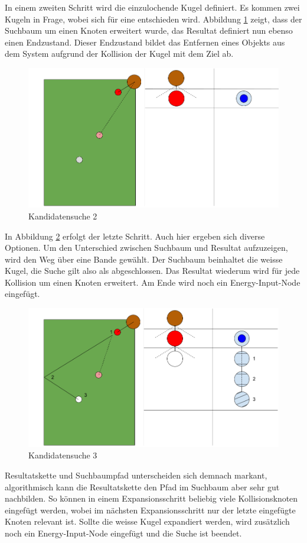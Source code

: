 In einem zweiten Schritt wird die einzulochende Kugel definiert. Es kommen zwei Kugeln in Frage, wobei sich für eine
entschieden wird. Abbildung \ref{fig:backwardsearch_2} zeigt, dass der Suchbaum um einen Knoten erweitert wurde, das
Resultat definiert nun ebenso einen Endzustand. Dieser Endzustand bildet das Entfernen eines Objekts aus dem System aufgrund
der Kollision der Kugel mit dem Ziel ab.
\begin{figure}[h!]
    \begin{center}
        \includegraphics[width=0.5\linewidth]{../common/03_billiard_ai/resources/12_backwardsearch_2.png}
    \end{center}
    \caption{Kandidatensuche 2}
    \label{fig:backwardsearch_2}
\end{figure}

In Abbildung \ref{fig:backwardsearch_3} erfolgt der letzte Schritt. Auch hier ergeben sich diverse Optionen. Um den
Unterschied zwischen Suchbaum und Resultat aufzuzeigen, wird den Weg über eine Bande gewählt. Der Suchbaum beinhaltet
die weisse Kugel, die Suche gilt also als abgeschlossen. Das Resultat wiederum wird für jede Kollision um einen
Knoten erweitert. Am Ende wird noch ein \glqq Energy-Input-Node\grqq{} eingefügt.
\begin{figure}[h!]
    \begin{center}
        \includegraphics[width=0.5\linewidth]{../common/03_billiard_ai/resources/13_backwardsearch_3.png}
    \end{center}
    \caption{Kandidatensuche 3}
    \label{fig:backwardsearch_3}
\end{figure}

Resultatskette und Suchbaumpfad unterscheiden sich demnach markant, algorithmisch kann die Resultatskette den Pfad im Suchbaum aber
sehr gut nachbilden. So können in einem Expansionsschritt beliebig viele Kollisionsknoten eingefügt werden, wobei im
nächsten Expansionsschritt nur der letzte eingefügte Knoten relevant ist. Sollte die weisse Kugel expandiert werden,
wird zusätzlich noch ein \glqq Energy-Input-Node\grqq{} eingefügt und die Suche ist beendet.

